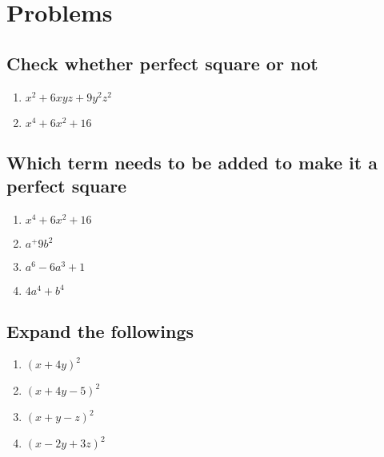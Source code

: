 \documentclass[12pt,a4paper,twoside]{book}
\begin{document}
	\section{Problems}
	\subsection{Check whether perfect square or not}
	\begin{multicols}{2}
		\begin{enumerate}
			\item $x^2+6xyz+9y^2z^2$
			\item $x^4+6x^2+16$
		\end{enumerate}
	\end{multicols}
	\subsection{Which term needs to be added to make it a perfect square}
	\begin{multicols}{2}
		\begin{enumerate}
			\item $x^4+6x^2+16$
			\item $a^+9b^2$
			\item $a^6-6a^3+1$
			\item $4a^4+b^4$
		\end{enumerate}
	\end{multicols}
	\subsection{Expand the followings}
	\begin{multicols}{2}
		\begin{enumerate}
			\item $(x+4y)^2$
			\item  $(x+4y-5)^2$
			\item $(x+y-z)^2$
			\item $(x-2y+3z)^2$
		\end{enumerate}
	\end{multicols}
\end{document}
